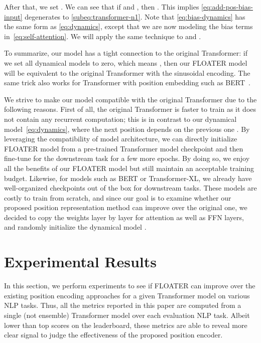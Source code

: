 \documentclass[11pt]{article}
\begin{document}
After that, we set . 
We can see that if   and , then . This implies \eqref{eq:add-pos-bias-input} degenerates to \eqref{subeq:transformer-n1}. 
Note that \eqref{eq:bias-dynamics} has the same form as \eqref{eq:dynamics}, except that we are now modeling the bias terms  in~\eqref{eq:self-attention}. We will apply the same technique to  and .
\par
To summarize, our model has a tight connection to the original Transformer: if we set all dynamical models to zero, which means , then our FLOATER model will be equivalent to the original Transformer with the sinusoidal encoding. The same trick also works for Transformer with position embedding such as BERT~\cite{devlin2018bert}.
\par
We strive to make our model compatible with the original Transformer due to the following reasons. First of all, the original Transformer is faster to train as it does not contain any recurrent computation; this is in contrast to our dynamical model~\eqref{eq:dynamics}, where the next position  depends on the previous one . By leveraging the compatibility of model architecture, we can directly initialize FLOATER model from a pre-trained Transformer model checkpoint and then fine-tune for the downstream task for a few more epochs. By doing so, we enjoy all the benefits of our FLOATER model but still maintain an acceptable training budget. Likewise, for models such as BERT or Transformer-XL, we already have well-organized checkpoints out of the box for downstream tasks. These models are costly to train from scratch, and since our goal is to examine whether our proposed position representation method can improve over the original one, we decided to copy the weights layer by layer for attention as well as FFN layers, and randomly initialize the dynamical model .



\section{Experimental Results}
\label{sec:exp}
In this section, we perform experiments to see if FLOATER can improve over the existing position encoding approaches for a given Transformer model on various NLP tasks. 
Thus, all the metrics reported in this paper are computed from a single (not ensemble) Transformer model over each evaluation NLP task. Albeit lower than top scores on the leaderboard, these metrics are able to reveal more clear signal to judge the effectiveness of the proposed position encoder.   
\end{document}
